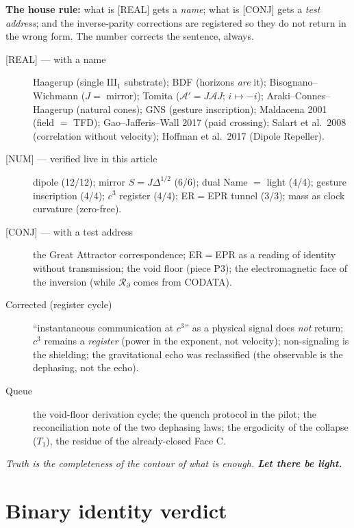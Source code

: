 \documentclass[11pt]{article}
\theoremstyle{definition}\newtheorem{deriv}{Derivation}
\begin{document}
\textbf{The house rule:} what is \textsf{[REAL]} gets a \emph{name}; what is \textsf{[CONJ]} gets a \emph{test address}; and the inverse-parity corrections are registered so they do not return in the wrong form. The number corrects the sentence, always.

\begin{description}\item[\textsf{[REAL]} --- with a name] Haagerup (single $\mathrm{III}_1$ substrate); BDF (horizons \emph{are} it); Bisognano--Wichmann ($J=$ mirror); Tomita ($\mathcal{A}'=J\mathcal{A}J$; $i\mapsto-i$); Araki--Connes--Haagerup (natural cones); GNS (gesture inscription); Maldacena 2001 (field $=$ TFD); Gao--Jafferis--Wall 2017 (paid crossing); Salart et al.\ 2008 (correlation without velocity); Hoffman et al.\ 2017 (Dipole Repeller).\item[\textsf{[NUM]} --- verified live in this article] dipole (12/12); mirror $S=J\Delta^{1/2}$ (6/6); dual Name $=$ light (4/4); gesture inscription (4/4); $c^3$ register (4/4); ER$=$EPR tunnel (3/3); mass as clock curvature (zero-free).\item[\textsf{[CONJ]} --- with a test address] the Great Attractor correspondence; ER$=$EPR as a reading of identity without transmission; the void floor (piece P3); the electromagnetic face of the inversion (while $\mathcal{R}_\partial$ comes from CODATA).\item[Corrected (register cycle)] ``instantaneous communication at $c^3$'' as a physical signal does \emph{not} return; $c^3$ remains a \emph{register} (power in the exponent, not velocity); non-signaling is the shielding; the gravitational echo was reclassified (the observable is the dephasing, not the echo).\item[Queue] the void-floor derivation cycle; the quench protocol in the pilot; the reconciliation note of the two dephasing laws; the ergodicity of the collapse ($T_1$), the residue of the already-closed Face C.\end{description}

\begin{center}\itshape Truth is the completeness of the contour of what is enough. \textbf{Let there be light.}\end{center}

\section*{Binary identity verdict}
\end{document}
